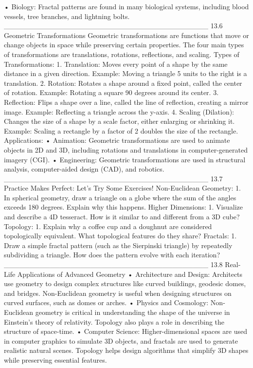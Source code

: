•	Biology: Fractal patterns are found in many biological systems, including blood vessels, tree branches, and lightning bolts.
________________________________________
13.6 Geometric Transformations
Geometric transformations are functions that move or change objects in space while preserving certain properties. The four main types of transformations are translations, rotations, reflections, and scaling.
Types of Transformations:
1.	Translation: Moves every point of a shape by the same distance in a given direction.
Example: Moving a triangle 5 units to the right is a translation.
2.	Rotation: Rotates a shape around a fixed point, called the center of rotation.
Example: Rotating a square 90 degrees around its center.
3.	Reflection: Flips a shape over a line, called the line of reflection, creating a mirror image.
Example: Reflecting a triangle across the y-axis.
4.	Scaling (Dilation): Changes the size of a shape by a scale factor, either enlarging or shrinking it.
Example: Scaling a rectangle by a factor of 2 doubles the size of the rectangle.
Applications:
•	Animation: Geometric transformations are used to animate objects in 2D and 3D, including rotations and translations in computer-generated imagery (CGI).
•	Engineering: Geometric transformations are used in structural analysis, computer-aided design (CAD), and robotics.
________________________________________
13.7 Practice Makes Perfect: Let’s Try Some Exercises!
Non-Euclidean Geometry:
1.	In spherical geometry, draw a triangle on a globe where the sum of the angles exceeds 180 degrees. Explain why this happens.
Higher Dimensions:
1.	Visualize and describe a 4D tesseract. How is it similar to and different from a 3D cube?
Topology:
1.	Explain why a coffee cup and a doughnut are considered topologically equivalent. What topological features do they share?
Fractals:
1.	Draw a simple fractal pattern (such as the Sierpinski triangle) by repeatedly subdividing a triangle. How does the pattern evolve with each iteration?
________________________________________
13.8 Real-Life Applications of Advanced Geometry
•	Architecture and Design: Architects use geometry to design complex structures like curved buildings, geodesic domes, and bridges. Non-Euclidean geometry is useful when designing structures on curved surfaces, such as domes or arches.
•	Physics and Cosmology: Non-Euclidean geometry is critical in understanding the shape of the universe in Einstein’s theory of relativity. Topology also plays a role in describing the structure of space-time.
•	Computer Science: Higher-dimensional spaces are used in computer graphics to simulate 3D objects, and fractals are used to generate realistic natural scenes. Topology helps design algorithms that simplify 3D shapes while preserving essential features.
